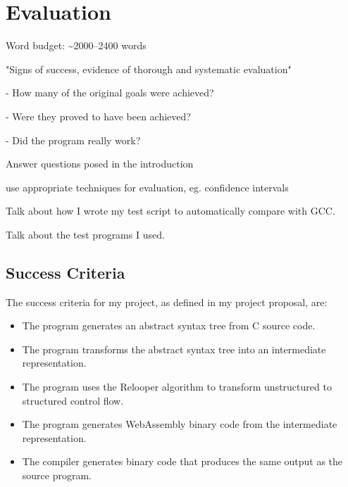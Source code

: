 \documentclass[00-main.tex]{subfiles}
\begin{document}
\chapter{Evaluation}

\newcommand{\IncludeStackPlot}[1]{\fbox{\resizebox{0.98\textwidth}{!}{}}}

\begin{Comment}
Word budget: \textasciitilde 2000--2400 words
\end{Comment}

\begin{Comment}
"Signs of success, evidence of thorough and systematic evaluation"

- How many of the original goals were achieved?

- Were they proved to have been achieved?

- Did the program really work?

Answer questions posed in the introduction

use appropriate techniques for evaluation, eg. confidence intervals
\end{Comment}

\begin{Comment}
Talk about how I wrote my test script to automatically compare with GCC.

Talk about the test programs I used.
\end{Comment}


\section{Success Criteria}

The success criteria for my project, as defined in my project proposal, are:
\begin{itemize}
\item The program generates an abstract syntax tree from C source code.
\item The program transforms the abstract syntax tree into an intermediate representation.
\item The program uses the Relooper algorithm to transform unstructured to structured control
flow.
\item The program generates WebAssembly binary code from the intermediate representation.
\item The compiler generates binary code that produces the same output as the source program.
\end{itemize}
\end{document}
